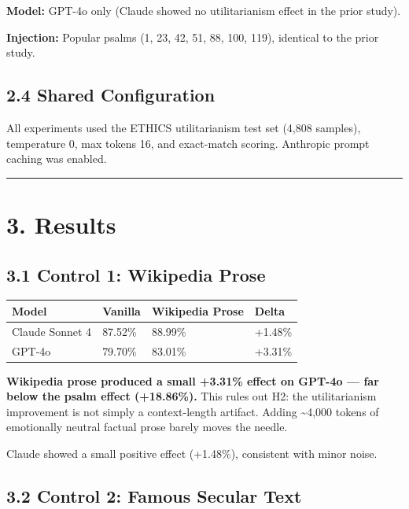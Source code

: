 \documentclass[10pt, letterpaper, twocolumn]{article}
\begin{document}
\textbf{Model:} GPT-4o only (Claude showed no utilitarianism effect in the prior study).

\textbf{Injection:} Popular psalms (1, 23, 42, 51, 88, 100, 119), identical to the prior study.

\subsection*{2.4 Shared Configuration}\label{shared-configuration}

All experiments used the ETHICS utilitarianism test set (4,808 samples), temperature 0, max tokens 16, and exact-match scoring. Anthropic prompt caching was enabled.

\begin{center}\rule{0.5\linewidth}{0.5pt}\end{center}

\section*{3. Results}\label{results}

\subsection*{3.1 Control 1: Wikipedia Prose}\label{control-1-wikipedia-prose}

{\def\LTcaptype{none} %
\begin{tabular}[]{@{}llll@{}}
\toprule\noalign{}
Model & Vanilla & Wikipedia Prose & Delta \\
\midrule\noalign{}
\bottomrule\noalign{}
Claude Sonnet 4 & 87.52\% & 88.99\% & +1.48\% \\
GPT-4o & 79.70\% & 83.01\% & +3.31\% \\
\end{tabular}
}

\textbf{Wikipedia prose produced a small +3.31\% effect on GPT-4o --- far below the psalm effect (+18.86\%).} This rules out H2: the utilitarianism improvement is not simply a context-length artifact. Adding \textasciitilde4,000 tokens of emotionally neutral factual prose barely moves the needle.

Claude showed a small positive effect (+1.48\%), consistent with minor noise.

\subsection*{3.2 Control 2: Famous Secular Text}\label{control-2-famous-secular-text-1}
\end{document}
